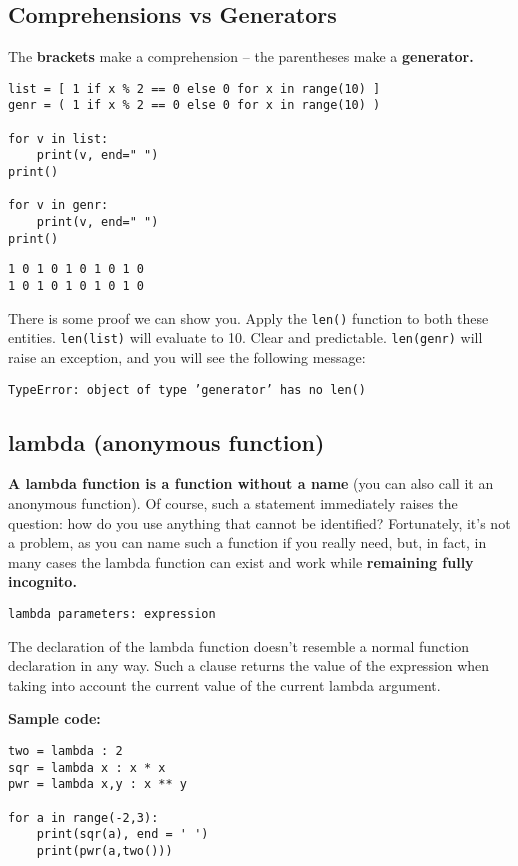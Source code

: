 \documentclass[11pt]{article}
\begin{document}
\subsection{Comprehensions vs Generators}
\label{sec:org3a49463}
The \textbf{brackets} make a comprehension – the parentheses make a \textbf{generator.}

\begin{verbatim}
list = [ 1 if x % 2 == 0 else 0 for x in range(10) ]
genr = ( 1 if x % 2 == 0 else 0 for x in range(10) )

for v in list:
	print(v, end=" ")
print()

for v in genr:
	print(v, end=" ")
print()
\end{verbatim}

\begin{verbatim}
1 0 1 0 1 0 1 0 1 0 
1 0 1 0 1 0 1 0 1 0 
\end{verbatim}

There is some proof we can show you. Apply the \texttt{len()} function to both
these entities. \texttt{len(list)} will evaluate to 10. Clear and predictable.
\texttt{len(genr)} will raise an exception, and you will see the following
message:

\texttt{TypeError: object of type 'generator' has no len()}

\subsection{lambda (anonymous function)}
\label{sec:orgbf2dbbf}
\textbf{A lambda function is a function without a name} (you can also call it
an anonymous function). Of course, such a statement immediately raises
the question: how do you use anything that cannot be identified?
Fortunately, it’s not a problem, as you can name such a function if
you really need, but, in fact, in many cases the lambda function can
exist and work while \textbf{remaining fully incognito.}

\texttt{lambda parameters: expression}

The declaration of the lambda function doesn’t resemble a normal
function declaration in any way.  Such a clause returns the value of
the expression when taking into account the current value of the
current lambda argument.

\vspace{10 mm}

\textbf{Sample code:}

\begin{verbatim}
two = lambda : 2
sqr = lambda x : x * x
pwr = lambda x,y : x ** y

for a in range(-2,3):
	print(sqr(a), end = ' ')
	print(pwr(a,two()))
\end{verbatim}
\end{document}
